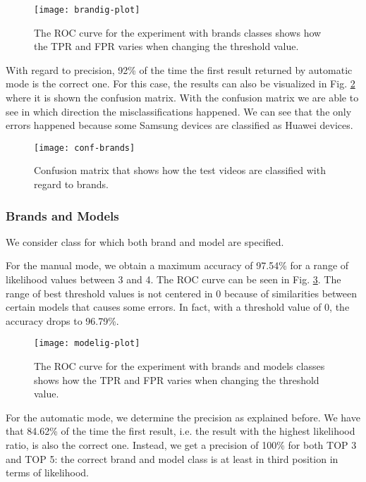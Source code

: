 \begin{figure}
  \centering
  \texttt{[image: brandig-plot]}
  \caption{The ROC curve for the experiment with brands classes shows how the TPR and FPR varies when changing the threshold value.}\label{fig:brand-roc}
\end{figure}

With regard to precision, 92\% of the time the first result returned by automatic mode is the correct one. For this case, the results can also be visualized in Fig. \ref{fig:brand-conf} where it is shown the confusion matrix. With the confusion matrix we are able to see in which direction the misclassifications happened. We can see that the only errors happened because some Samsung devices are classified as Huawei devices. 

\begin{figure}
  \centering
  \texttt{[image: conf-brands]}
  \caption{Confusion matrix that shows how the test videos are classified with regard to brands.}\label{fig:brand-conf}
\end{figure}

\subsubsection*{Brands and Models}

We consider class for which both brand and model are specified. 

For the manual mode, we obtain a maximum accuracy of 97.54\% for a range of likelihood values between 3 and 4. The ROC curve can be seen in Fig. \ref{fig:model-roc}.  The range of best threshold values is not centered in 0 because of similarities between certain models that causes some errors. In fact, with a threshold value of 0, the accuracy drops to 96.79\%.

\begin{figure}
  \centering
  \texttt{[image: modelig-plot]}
  \caption{The ROC curve for the experiment with brands and models classes shows how the TPR and FPR varies when changing the threshold value.}\label{fig:model-roc}
\end{figure}

For the automatic mode, we determine the precision as explained before. We have that 84.62\% of the time the first result, i.e. the result with the highest likelihood ratio, is also the correct one. Instead, we get a precision of 100\% for both TOP 3 and TOP 5: the correct brand and model class is at least in third position in terms of likelihood.